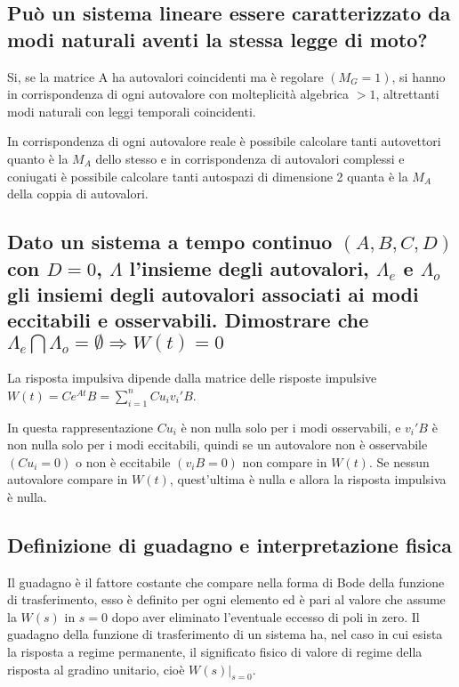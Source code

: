 \documentclass{article}
\begin{document}
\subsection{Può un sistema lineare essere caratterizzato da modi naturali aventi la stessa legge di moto?}
Si, se la matrice A ha autovalori coincidenti ma è regolare $(M_G=1)$,
si hanno in corrispondenza di ogni autovalore con molteplicità algebrica $>1$,
altrettanti modi naturali con leggi temporali coincidenti.

In corrispondenza di ogni autovalore reale è possibile calcolare tanti autovettori quanto è la
$M_A$ dello stesso e in corrispondenza di autovalori complessi e coniugati
è possibile calcolare tanti autospazi di dimensione 2 quanta è la $M_A$
della coppia di autovalori.



\subsection{\boldmath Dato un sistema a tempo continuo $(A, B, C, D)$ con $D = 0$, $\Lambda$
l'insieme degli
autovalori, $\Lambda_e$ e $\Lambda_o$ gli insiemi degli autovalori associati ai modi eccitabili e
osservabili. Dimostrare che $\Lambda_e  \bigcap\Lambda_o = \emptyset \Longrightarrow W(t) = 0$}

La risposta impulsiva dipende dalla matrice delle risposte impulsive
\(\displaystyle W(t)=Ce^{At}B=\sum_{i=1}^{n}C u_i v_i' B\).

In questa rappresentazione $C u_i$ è non nulla solo per i modi osservabili,
e $v_i'B$ è non nulla solo per i modi eccitabili,
quindi se un autovalore non è osservabile $(Cu_i=0)$ o non è eccitabile $(v_iB=0)$
non compare in $W(t)$.
Se nessun autovalore compare in $W(t)$, quest'ultima è nulla e allora la risposta impulsiva è nulla.


\subsection{Definizione di guadagno e interpretazione fisica}
Il guadagno è il fattore costante che compare nella forma di Bode della funzione di trasferimento,
esso è definito per ogni elemento ed è pari al valore che assume la $W(s)$
in $s=0$ dopo aver eliminato l'eventuale eccesso di poli in zero.
Il guadagno della funzione di trasferimento di un sistema ha,
nel caso in cui esista la risposta a regime permanente,
il significato fisico di valore di regime della risposta al gradino unitario,
cioè $W(s)|_{s=0}$.
\end{document}
